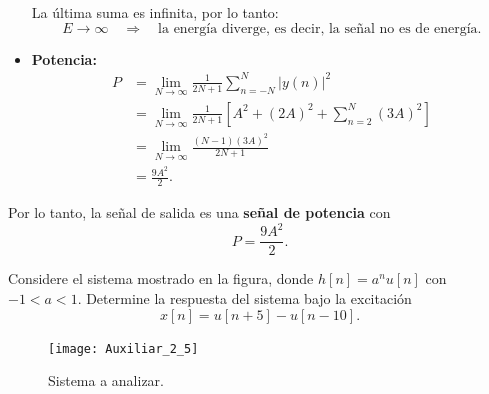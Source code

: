 \documentclass[
  11pt,
  letterpaper,
   addpoints,
   answers
  ]{exam}
\begin{document}
\begin{questions}
\begin{solution}
\begin{itemize}
La última suma es infinita, por lo tanto:
\begin{equation}
E \to \infty \quad \Rightarrow \quad \text{la energía diverge, es decir, la señal no es de energía.}
\end{equation}

\item \textbf{Potencia:}  
\begin{align}
P &= \lim_{N\to\infty} \frac{1}{2N+1} \sum_{n=-N}^{N} |y(n)|^2 \\
  &= \lim_{N\to\infty} \frac{1}{2N+1} 
     \left[ A^2 + (2A)^2 + \sum_{n=2}^{N} (3A)^2 \right] \\
  &= \lim_{N\to\infty} \frac{(N-1)(3A)^2}{2N+1} \\
  &= \frac{9A^2}{2}.
\end{align}
\end{itemize}

Por lo tanto, la señal de salida es una \textbf{señal de potencia} con 
\begin{equation}
P = \frac{9A^2}{2}.
\end{equation}
\end{solution}
\question Considere el sistema mostrado en la figura, donde \(h[n]=a^n u[n]\) con \(-1<a<1\). Determine la respuesta del sistema bajo la excitación
\[x[n]=u[n+5]-u[n-10].\]

\begin{figure}[H]
  \centering
  \texttt{[image: Auxiliar\_2\_5]}
  \caption{Sistema a analizar.}
\end{figure}
\begin{solution}

\end{solution}
\end{questions}
\end{document}
